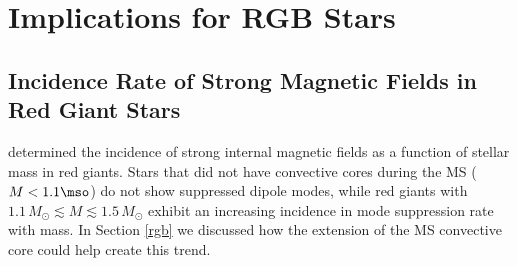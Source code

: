 \section{Implications for RGB Stars}\label{rgb_implications}
\subsection{Incidence Rate of Strong Magnetic Fields in Red Giant Stars}
\citet{Stello_2016} determined the incidence of strong internal magnetic fields as a function of stellar mass in red giants. Stars that did not have convective cores during the MS ($M<1.1\mso$) do not show suppressed dipole modes, while red giants with $1.1 \, M_\odot \lesssim M \lesssim 1.5 \, M_\odot$ exhibit an increasing incidence in mode suppression rate with mass. In Section \ref{rgb} we discussed how the extension of the MS convective core could help create this trend. 

